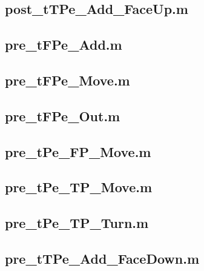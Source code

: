 \documentclass[runningheads,a4paper]{llncs}
\newcommand{\GPenSIM}{../GPenSIM}
\begin{document}
\subsection{post\_tTPe\_Add\_FaceUp.m}
\label{app:post_tTPe_Add_FaceUp.m}


\subsection{pre\_tFPe\_Add.m}
\label{app:pre_tFPe_Add.m}


\subsection{pre\_tFPe\_Move.m}
\label{app:pre_tFPe_Move.m}


\subsection{pre\_tFPe\_Out.m}
\label{app:pre_tFPe_Out.m}


\subsection{pre\_tPe\_FP\_Move.m}
\label{app:pre_tPe_FP_Move.m}


\subsection{pre\_tPe\_TP\_Move.m}
\label{app:pre_tPe_TP_Move.m}


\subsection{pre\_tPe\_TP\_Turn.m}
\label{app:pre_tPe_TP_Turn.m}


\subsection{pre\_tTPe\_Add\_FaceDown.m}
\label{app:pre_tTPe_Add_FaceDown.m}

\end{document}
